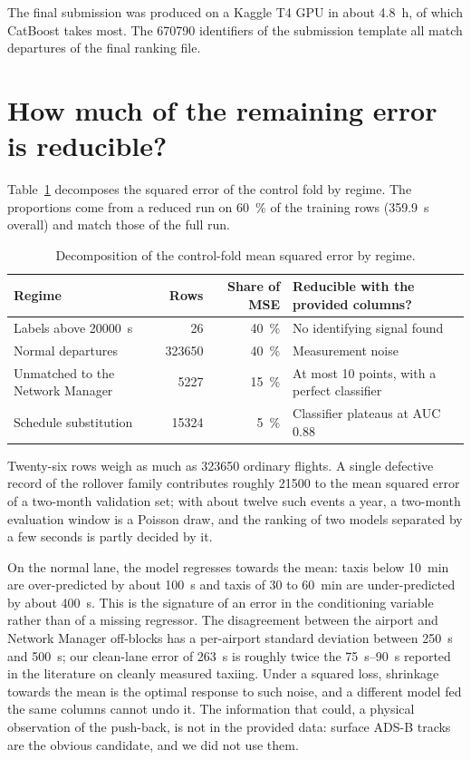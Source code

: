 \documentclass[11pt,a4paper]{article}
\begin{document}
The final submission was produced on a Kaggle T4 GPU in about \SI{4.8}{\hour},
of which CatBoost takes most. The \num{670790} identifiers of the submission
template all match departures of the final ranking file.

\section{How much of the remaining error is reducible?}
\label{sec:floor}

Table~\ref{tab:anatomy} decomposes the squared error of the control fold by
regime. The proportions come from a reduced run on \SI{60}{\percent} of the
training rows (\SI{359.9}{\second} overall) and match those of the full run.

\begin{table}[t]
\centering
\caption{Decomposition of the control-fold mean squared error by regime.}
\label{tab:anatomy}
\begin{tabular}{p{4.2cm}rrp{5.4cm}}
\toprule
Regime & Rows & Share of MSE & Reducible with the provided columns? \\
\midrule
Labels above \SI{20000}{\second} & 26 & \SI{40}{\percent} & No identifying signal found \\
Normal departures & \num{323650} & \SI{40}{\percent} & Measurement noise \\
Unmatched to the Network Manager & \num{5227} & \SI{15}{\percent} & At most 10 points, with a perfect classifier \\
Schedule substitution & \num{15324} & \SI{5}{\percent} & Classifier plateaus at AUC 0.88 \\
\bottomrule
\end{tabular}
\end{table}

Twenty-six rows weigh as much as \num{323650} ordinary flights. A single
defective record of the rollover family contributes roughly \num{21500} to the
mean squared error of a two-month validation set; with about twelve such
events a year, a two-month evaluation window is a Poisson draw, and the
ranking of two models separated by a few seconds is partly decided by it.

On the normal lane, the model regresses towards the mean: taxis below
\SI{10}{\minute} are over-predicted by about \SI{100}{\second} and taxis of
30 to \SI{60}{\minute} are under-predicted by about \SI{400}{\second}. This is
the signature of an error in the conditioning variable rather than of a
missing regressor. The disagreement between the airport and Network Manager
off-blocks has a per-airport standard deviation between \SI{250}{\second} and
\SI{500}{\second}; our clean-lane error of \SI{263}{\second} is roughly twice
the \SIrange{75}{90}{\second} reported in the literature on cleanly measured
taxiing. Under a squared loss, shrinkage towards the mean is the optimal
response to such noise, and a different model fed the same columns cannot
undo it. The information that could, a physical observation of the
push-back, is not in the provided data: surface ADS-B tracks are the obvious
candidate, and we did not use them.
\end{document}
